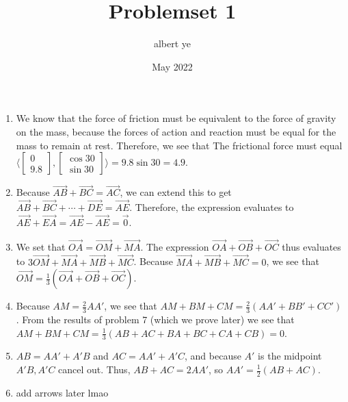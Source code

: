 \documentclass{scrartcl}
\title{Problemset 1}
\author{albert ye}
\date{May 2022}
\makeatletter
\newcommand{\skipitems}[1]{%
  \addtocounter{\@enumctr}{#1}%
}
\makeatother
\begin{document}
\maketitle
\begin{enumerate}
	\item We know that the force of friction must be equivalent to the force of gravity on the mass, because
	the forces of action and reaction must be equal for the mass to remain at rest. Therefore, we see that The
	frictional force must equal $\langle \begin{bmatrix}0 \\ 9.8 \end{bmatrix},
	\begin{bmatrix} \cos 30 \\ \sin 30 \end{bmatrix} \rangle = 9.8 \sin 30 = \boxed{4.9}$.
	\skipitems{1}
	\item Because $\vec{AB} + \vec{BC} = \vec{AC}$, we can extend this to get $\vec{AB} + \vec{BC} + \cdots +
	\vec{DE} = \vec{AE}$. Therefore, the expression evaluates to $\vec{AE} + \vec{EA} = \vec{AE} - \vec{AE} = \vec 0$.
	\item We set that $\vec{OA} = \vec{OM} + \vec{MA}$. The expression $\vec{OA} + \vec{OB} + \vec{OC}$ thus
	evaluates to $3\vec{OM} + \vec{MA} + \vec{MB} + \vec{MC}$. Because $\vec{MA} + \vec{MB} + \vec{MC} = 0$,
	we see that $\vec{OM} = \frac{1}{3}(\vec{OA} + \vec{OB} + \vec{OC})$.
	\item Because $AM = \frac{2}{3} AA'$, we see that $AM + BM + CM = \frac{2}{3}(AA' + BB' + CC')$. 
	From the results of problem 7 (which we prove later) we see that $AM + BM + CM = \frac{1}{3}( 
		AB + AC + BA + BC + CA + CB
	) = 0$.
	\skipitems{1}
	\item $AB = AA' + A'B$ and $AC = AA' + A'C$, and because $A'$ is the midpoint $A'B, A'C$ cancel out. 
	Thus, $AB + AC = 2AA'$, so $AA' = \frac{1}{2}(AB + AC)$.
	\item add arrows later lmao
\end{enumerate}
\end{document}
